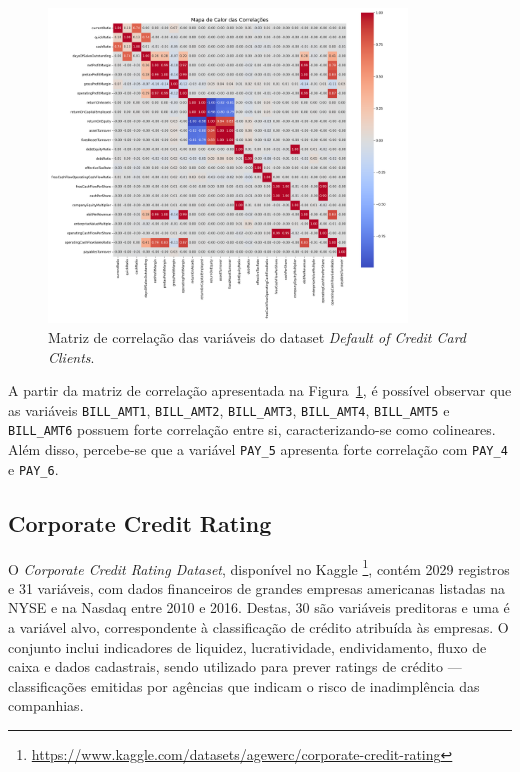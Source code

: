 \begin{figure}[H]
    \centering
    \includegraphics[width=0.85\textwidth]{figs/matriz_correlacao_inadimplencia.png}
    \caption{Matriz de correlação das variáveis do dataset \textit{Default of Credit Card Clients}.}
    \label{fig:matriz_correlacao_inadimplencia}
\end{figure}

A partir da matriz de correlação apresentada na Figura~\ref{fig:matriz_correlacao_inadimplencia}, é possível observar que as variáveis \texttt{BILL\_AMT1}, \texttt{BILL\_AMT2}, \texttt{BILL\_AMT3}, \texttt{BILL\_AMT4}, \texttt{BILL\_AMT5} e \texttt{BILL\_AMT6} possuem forte correlação entre si, caracterizando-se como colineares. Além disso, percebe-se que a variável \texttt{PAY\_5} apresenta forte correlação com \texttt{PAY\_4} e \texttt{PAY\_6}.

\subsection{Corporate Credit Rating}

O \textit{Corporate Credit Rating Dataset}, disponível no Kaggle \footnote{\url{https://www.kaggle.com/datasets/agewerc/corporate-credit-rating}}, contém 2029 registros e 31 variáveis, com dados financeiros de grandes empresas americanas listadas na NYSE e na Nasdaq entre 2010 e 2016. Destas, 30 são variáveis preditoras e uma é a variável alvo, correspondente à classificação de crédito atribuída às empresas. O conjunto inclui indicadores de liquidez, lucratividade, endividamento, fluxo de caixa e dados cadastrais, sendo utilizado para prever ratings de crédito — classificações emitidas por agências que indicam o risco de inadimplência das companhias.

